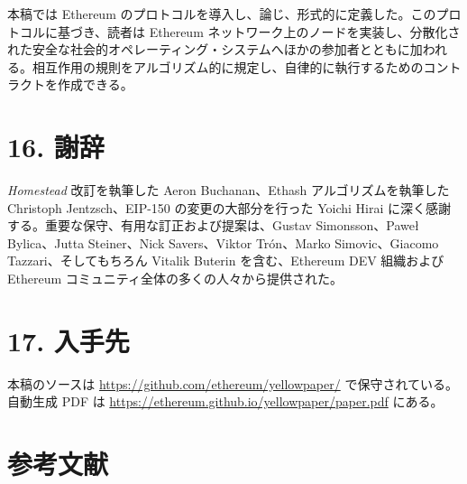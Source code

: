 \documentclass[
]{ltjsarticle}
\begin{document}
本稿では Ethereum
のプロトコルを導入し、論じ、形式的に定義した。このプロトコルに基づき、読者は
Ethereum
ネットワーク上のノードを実装し、分散化された安全な社会的オペレーティング・システムへほかの参加者とともに加われる。相互作用の規則をアルゴリズム的に規定し、自律的に執行するためのコントラクトを作成できる。

\hypertarget{ux8b1dux8f9e}{%
\section{16. 謝辞}\label{ux8b1dux8f9e}}

\emph{Homestead} 改訂を執筆した Aeron Buchanan、Ethash
アルゴリズムを執筆した Christoph Jentzsch、EIP-150
の変更の大部分を行った Yoichi Hirai
に深く感謝する。重要な保守、有用な訂正および提案は、Gustav
Simonsson、Paweł Bylica、Jutta Steiner、Nick Savers、Viktor Trón、Marko
Simovic、Giacomo Tazzari、そしてもちろん Vitalik Buterin
を含む、Ethereum DEV 組織および Ethereum
コミュニティ全体の多くの人々から提供された。

\hypertarget{ux5165ux624bux5148}{%
\section{17. 入手先}\label{ux5165ux624bux5148}}

本稿のソースは \url{https://github.com/ethereum/yellowpaper/}
で保守されている。自動生成 PDF は
\url{https://ethereum.github.io/yellowpaper/paper.pdf} にある。

\hypertarget{ux53c2ux8003ux6587ux732e}{%
\section{参考文献}\label{ux53c2ux8003ux6587ux732e}}
\end{document}
